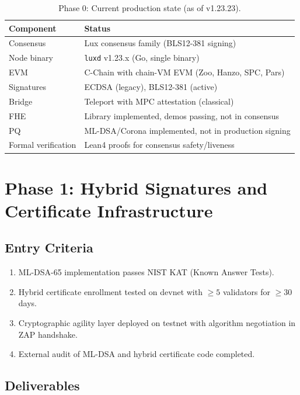 \documentclass[11pt]{article}
\begin{document}
\begin{table}[h]
\centering
\small
\begin{tabular}{@{}ll@{}}
\toprule
\textbf{Component} & \textbf{Status} \\
\midrule
Consensus & Lux consensus family (BLS12-381 signing) \\
Node binary & \texttt{luxd} v1.23.x (Go, single binary) \\
EVM & C-Chain with chain-VM EVM (Zoo, Hanzo, SPC, Pars) \\
Signatures & ECDSA (legacy), BLS12-381 (active) \\
Bridge & Teleport with MPC attestation (classical) \\
FHE & Library implemented, demos passing, not in consensus \\
PQ & ML-DSA/Corona implemented, not in production signing \\
Formal verification & Lean4 proofs for consensus safety/liveness \\
\bottomrule
\end{tabular}
\caption{Phase 0: Current production state (as of v1.23.23).}
\label{tab:phase0}
\end{table}

\section{Phase 1: Hybrid Signatures and Certificate Infrastructure}

\subsection{Entry Criteria}

\begin{enumerate}
\item ML-DSA-65 implementation passes NIST KAT (Known Answer Tests).
\item Hybrid certificate enrollment tested on devnet with $\geq 5$ validators for $\geq 30$ days.
\item Cryptographic agility layer deployed on testnet with algorithm negotiation in ZAP handshake.
\item External audit of ML-DSA and hybrid certificate code completed.
\end{enumerate}

\subsection{Deliverables}
\end{document}
